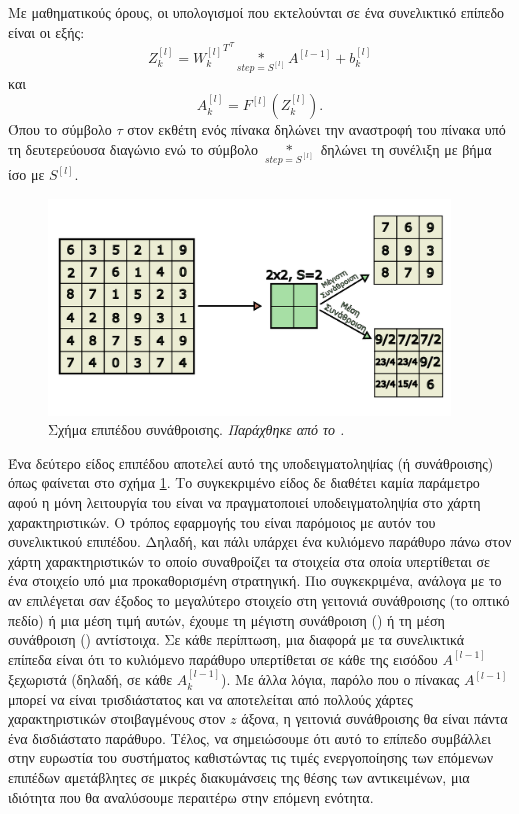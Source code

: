 Με μαθηματικούς όρους, οι υπολογισμοί που εκτελούνται σε ένα συνελικτικό επίπεδο είναι οι εξής:
\begin{equation}
  Z^{[l]}_k = {{W^{[l]}_k}^T }^{\tau} \underset{{step=S^{[l]}}} {\ast} A^{[l-1]} + b^{[l]}_k
\end{equation}
και
\begin{equation}
  A^{[l]}_k = F^{[l]}(Z^{[l]}_k).
\end{equation}
Όπου το σύμβολο $\tau$ στον εκθέτη ενός πίνακα δηλώνει την αναστροφή του πίνακα υπό τη δευτερεύουσα διαγώνιο ενώ το σύμβολο $\underset{{step=S^{[l]}}} {\ast}$ δηλώνει τη συνέλιξη με βήμα ίσο με $S^{[l]}$. \par

\begin{figure}[h]
  \centering
  \includegraphics[width=0.95\textwidth]{images/chapter theoritical background/max_avg_pooling_gr.pdf}
  \caption{Σχήμα επιπέδου συνάθροισης. \textit{Παράχθηκε από το \href{https://inkscape.org/}{}.}} 
  \label{fig:max_avg_pooling}
\end{figure}
 
Ένα δεύτερο είδος επιπέδου αποτελεί αυτό της υποδειγματοληψίας (ή συνάθροισης) όπως φαίνεται στο σχήμα \ref{fig:max_avg_pooling}. Το συγκεκριμένο είδος δε διαθέτει καμία παράμετρο αφού η μόνη λειτουργία του είναι να πραγματοποιεί υποδειγματοληψία στο χάρτη χαρακτηριστικών. Ο τρόπος εφαρμογής του είναι παρόμοιος με αυτόν του συνελικτικού επιπέδου. Δηλαδή, και πάλι υπάρχει ένα κυλιόμενο παράθυρο πάνω στον χάρτη χαρακτηριστικών το οποίο συναθροίζει τα στοιχεία στα οποία υπερτίθεται σε ένα στοιχείο υπό μια προκαθορισμένη στρατηγική. Πιο συγκεκριμένα, ανάλογα με το αν επιλέγεται σαν έξοδος το μεγαλύτερο στοιχείο στη γειτονιά συνάθροισης (το οπτικό πεδίο) ή μια μέση τιμή αυτών, έχουμε τη μέγιστη συνάθροιση () ή τη μέση συνάθροιση () αντίστοιχα. Σε κάθε περίπτωση, μια διαφορά με τα συνελικτικά επίπεδα είναι ότι το κυλιόμενο παράθυρο υπερτίθεται σε κάθε  της εισόδου $A^{[l-1]}$ ξεχωριστά (δηλαδή, σε κάθε $A^{[l-1]}_k$). Με άλλα λόγια, παρόλο που ο πίνακας $A^{[l-1]}$ μπορεί να είναι τρισδιάστατος και να αποτελείται από πολλούς χάρτες χαρακτηριστικών στοιβαγμένους στον $z$ άξονα, η γειτονιά συνάθροισης θα είναι πάντα ένα δισδιάστατο παράθυρο. Τέλος, να σημειώσουμε ότι αυτό το επίπεδο συμβάλλει στην ευρωστία του συστήματος καθιστώντας τις τιμές ενεργοποίησης των επόμενων επιπέδων αμετάβλητες σε μικρές διακυμάνσεις της θέσης των αντικειμένων, μια ιδιότητα που θα αναλύσουμε περαιτέρω στην επόμενη ενότητα. \par

